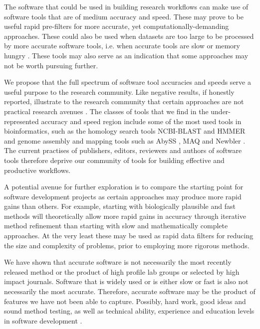 \documentclass[fleqn,10pt]{SelfArx} %
\begin{document}
The software that could be used in building research workflows can make use of software tools that are of medium accuracy and speed. These may prove to be useful rapid pre-filters for more accurate, yet computationally-demanding approaches. These could also be used when datasets are too large to be processed by more accurate software tools, i.e. when accurate tools are slow or memory hungry \cite{Lowe1997-hq,Weinberg2006-tm}. These tools may also serve as an indication that some approaches may not be worth pursuing further.

We propose that the full spectrum of software tool accuracies and speeds serve a useful purpose to the research community. Like negative results, if honestly reported, illustrate to the research community that certain approaches are not practical research avenues \cite{Ioannidis2005-xh,Workman1999-au,Rivas2000-fb}. The classes of tools that we find in the under-represented accuracy and speed region include some of the most used tools in bioinformatics, such as the homology search tools NCBI-BLAST \cite{Altschul1990-ht,Altschul1997-ga} and HMMER \cite{Eddy:2009} and genome assembly and mapping tools such as AbySS \cite{Simpson:2009}, MAQ \cite{Li:2008} and Newbler \cite{Margulies:2005}. The current practises of publishers, editors, reviewers and authors of software tools therefore deprive our community of tools for building effective and productive workflows.

A potential avenue for further exploration is to compare the starting point for software development projects as certain approaches may produce more rapid gains than others. For example, starting with biologically plausible and fast methods will theoretically allow more rapid gains in accuracy through iterative method refinement than starting with slow and mathematically complete approaches. At the very least these may be used as rapid data filters for reducing the size and complexity of problems, prior to employing more rigorous methods. 


We have shown that accurate software is not necessarily the most recently released method or the product of high profile lab groups or selected by high impact journals. Software that is widely used or is either slow or fast is also not necessarily the most accurate. Therefore, accurate software may be the product of features we have not been able to capture. Possibly, hard work, good ideas and sound method testing, as well as technical ability, experience and education levels in software development \cite{Wilson2006-ih}. 
\end{document}
